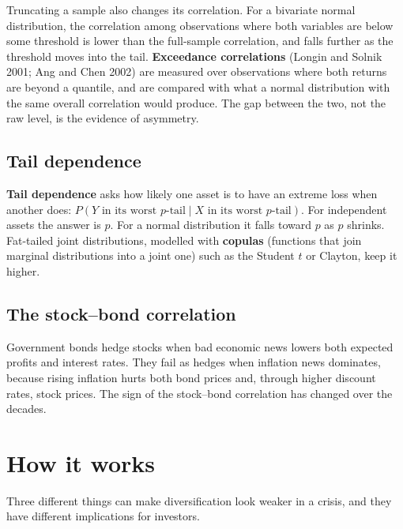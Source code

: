 Truncating a sample also changes its correlation. For a bivariate normal distribution, the correlation among observations where both variables are below some threshold is lower than the full-sample correlation, and falls further as the threshold moves into the tail. \textbf{Exceedance correlations} (Longin and Solnik 2001; Ang and Chen 2002) are measured over observations where both returns are beyond a quantile, and are compared with what a normal distribution with the same overall correlation would produce. The gap between the two, not the raw level, is the evidence of asymmetry.

\subsection{Tail dependence}

\textbf{Tail dependence} asks how likely one asset is to have an extreme loss when another does: $P(Y \text{ in its worst } p\text{-tail} \mid X \text{ in its worst } p\text{-tail})$. For independent assets the answer is $p$. For a normal distribution it falls toward $p$ as $p$ shrinks. Fat-tailed joint distributions, modelled with \textbf{copulas} (functions that join marginal distributions into a joint one) such as the Student $t$ or Clayton, keep it higher.

\subsection{The stock--bond correlation}

Government bonds hedge stocks when bad economic news lowers both expected profits and interest rates. They fail as hedges when inflation news dominates, because rising inflation hurts both bond prices and, through higher discount rates, stock prices. The sign of the stock--bond correlation has changed over the decades.

\section{How it works}
\label{sec:20-how}

Three different things can make diversification look weaker in a crisis, and they have different implications for investors.

